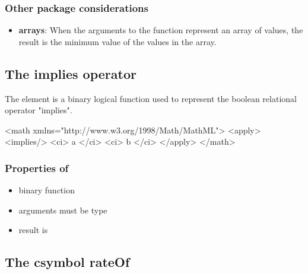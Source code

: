 \subsubsection{Other package considerations}

\begin{itemize}

\item \textbf{arrays}: When the arguments to the  function represent an array of values, the result is the minimum value of the values in the array.

 
\end{itemize}
\subsection{The implies operator}
\label{sec_implies}

The  element is a binary logical function used to represent the boolean relational operator "implies".

\begin{example}
<math xmlns="http://www.w3.org/1998/Math/MathML">
    <apply>
        <implies/>
        <ci> a </ci>
        <ci> b </ci>
    </apply>
</math>
\end{example}

\subsubsection{Properties of }

\begin{itemize}\setlength{\parskip}{-0.3ex}

\item binary function

\item arguments must be type 

\item result is 


\end{itemize}



\subsection{The csymbol rateOf}
\label{sec_rateOf}

